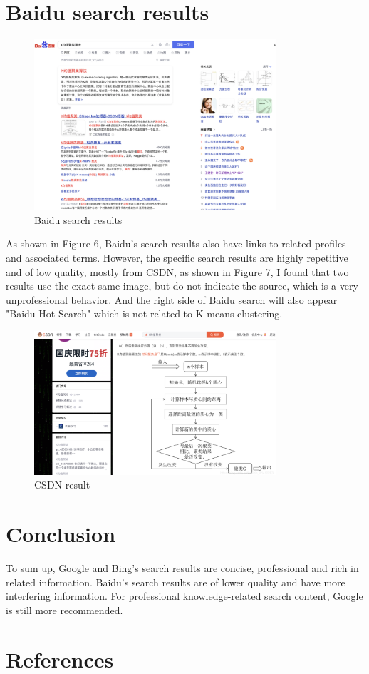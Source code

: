 \documentclass{article}
\begin{document}
    \section{Baidu search results}
    \begin{figure}[ht]
        \centering
        \includegraphics[width=0.8\textwidth]{Baidu_home.png}
        \caption{Baidu search results}
    \end{figure}
    As shown in Figure 6, Baidu's search results also have links to related profiles and associated terms. However, the specific search results are highly repetitive and of low quality, mostly from CSDN, as shown in Figure 7, I found that two results use the exact same image, but do not indicate the source, which is a very unprofessional behavior. And the right side of Baidu search will also appear "Baidu Hot Search" which is not related to K-means clustering.
    \begin{figure}[ht]
        \centering
        \includegraphics[width=0.8\textwidth]{Baidu1.png}
        \caption{CSDN result}
    \end{figure}

    \section{Conclusion}
    To sum up, Google and Bing's search results are concise, professional and rich in related information. Baidu's search results are of lower quality and have more interfering information. For professional knowledge-related search content, Google is still more recommended.

    \section{References}
\end{document}
